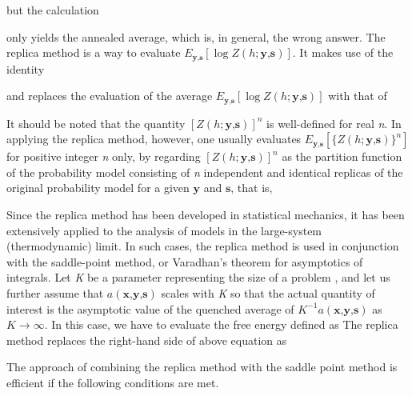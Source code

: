 \documentclass[letterpaper,english,10pt]{article}
\begin{document}

but the calculation

only yields the annealed average, which is, in general, the wrong answer.
The replica method is a way to evaluate $E_{\textbf{y,s}}[\log{Z(h;\textbf{y,s})}]$. It makes use of the identity


and replaces the evaluation of the average $E_{\textbf{y,s}}[\log{Z(h;\textbf{y,s})}]$ with that of


It should be noted that the quantity $[Z(h;\textbf{y,s})]^n$ is well-defined for real \textit{n}. In applying the replica method, however, one
usually evaluates $E_{\textbf{y,s}}[\{Z(h;\textbf{y,s})\}^n]$ for positive integer \textit{n} only, by regarding $[Z(h;\textbf{y,s})]^n$ as the partition function of the probability model consisting of \textit{n} independent and identical replicas of the original probability model for a given $\textbf{y}$ and $\textbf{s}$, that is,


Since the replica method has been developed in statistical mechanics, it has been extensively applied to the analysis of models in the large-system (thermodynamic) limit. In such cases, the replica method is used in conjunction with the saddle-point method, or Varadhan’s theorem for asymptotics of integrals. Let \textit{K} be a parameter representing the size of a problem , and let us further assume that $a(\textbf{x,y,s})$
scales with \textit{K} so that the actual quantity of interest is the asymptotic value of the quenched average of $K^{-1}a(\textbf{x,y,s})$ as $K \to \infty$. In this case, we have to evaluate the free energy defined as
    The replica method replaces the right-hand side of above equation as

The approach of combining the replica method with the saddle point method is efficient if the following conditions are met.
\end{document}
